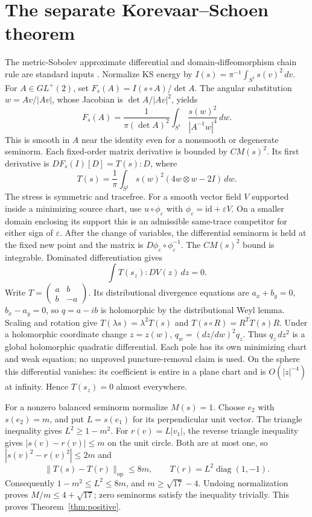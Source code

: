 \documentclass[11pt]{article}
\newcommand{\op}{\operatorname{op}}
\begin{document}
\section{The separate Korevaar--Schoen theorem}
The metric-Sobolev approximate differential and domain-diffeomorphism chain
rule are standard inputs \cite{ks,mvw,lw}. Normalize KS energy by
$I(s)=\pi^{-1}\int_{S^1}s(v)^2\,dv$. For $A\in GL^+(2)$, set
$F_s(A)=I(s\circ A)/\det A$. The angular substitution $w=Av/|Av|$, whose
Jacobian is $\det A/|Av|^2$, yields
\begin{equation}\label{eq:angular}
 F_s(A)=\frac1{\pi(\det A)^2}\int_{S^1}
             \frac{s(w)^2}{|A^{-1}w|^4}\,dw.
\end{equation}
This is smooth in $A$ near the identity even for a nonsmooth or degenerate
seminorm. Each fixed-order matrix derivative is bounded by $C M(s)^2$.
Its first derivative is $DF_s(I)[D]=T(s):D$, where
\[
 T(s)=\frac1\pi\int_{S^1}s(w)^2(4w\otimes w-2I)\,dw.
\]
The stress is symmetric and tracefree. For a smooth vector field $V$ supported
inside a minimizing source chart, use $u\circ\phi_\varepsilon$ with
$\phi_\varepsilon=\mathrm{id}+\varepsilon V$. On a smaller domain enclosing
its support this is an admissible same-trace competitor for either sign of
$\varepsilon$. After the change of variables, the differential seminorm
is held at the fixed new point and the matrix is
$D\phi_\varepsilon\circ\phi_\varepsilon^{-1}$. The $CM(s)^2$ bound is
integrable. Dominated differentiation gives
\[
 \int T(s_z):DV(z)\,dz=0.
\]
Write $T=\left(\begin{smallmatrix}a&b\\b&-a\end{smallmatrix}\right)$.
Its distributional divergence equations are
$a_x+b_y=0$, $b_x-a_y=0$, so $q=a-ib$ is holomorphic by the distributional
Weyl lemma. Scaling and rotation give
$T(\lambda s)=\lambda^2T(s)$ and $T(s\circ R)=R^TT(s)R$.
Under a holomorphic coordinate change $z=z(w)$,
$q_w=(dz/dw)^2q_z$. Thus $q_z\,dz^2$ is a global holomorphic quadratic
differential. Each pole has its own minimizing chart and weak equation;
no unproved puncture-removal claim is used. On the sphere this differential
vanishes: its coefficient is entire in a plane chart and is $O(|z|^{-4})$
at infinity. Hence $T(s_z)=0$ almost everywhere.

For a nonzero balanced seminorm normalize $M(s)=1$. Choose $e_2$ with
$s(e_2)=m$, and put $L=s(e_1)$ for its perpendicular unit vector.
The triangle inequality gives $L^2\ge1-m^2$. For $r(v)=L|v_1|$,
the reverse triangle inequality gives $|s(v)-r(v)|\le m$ on the unit circle.
Both are at most one, so $|s(v)^2-r(v)^2|\le2m$ and
\[
 \|T(s)-T(r)\|_{\op}\le8m,\qquad T(r)=L^2\operatorname{diag}(1,-1).
\]
Consequently $1-m^2\le L^2\le8m$, and $m\ge\sqrt{17}-4$.
Undoing normalization proves $M/m\le4+\sqrt{17}$; zero seminorms satisfy
the inequality trivially. This proves Theorem~\ref{thm:positive}.
\end{document}
